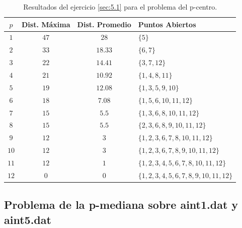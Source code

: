 \documentclass[spanish]{article}
\begin{document}
			\begin{table}[h]
				\begin{center}
					\begin{tabular}{|c || c || c || l | }
						\hline
						$p$		& Dist. Máxima 	& Dist. Promedio	& Puntos Abiertos	 \\ \hline \hline
						$1$ 	& $47$ 					& $28$						& $\{5\}$ \\ \hline
						$2$ 	& $33$ 					& $18.33$					& $\{6,7\}$ \\ \hline
						$3$ 	& $22$ 					& $14.41$					& $\{3,7,12\}$ \\ \hline
						$4$ 	& $21$ 					& $10.92$					& $\{1,4,8,11\}$ \\ \hline
						$5$ 	& $19$ 					& $12.08$					& $\{1,3,5,9,10\}$ \\ \hline
						$6$ 	& $18$ 					& $7.08$					& $\{1,5,6,10,11,12 \}$ \\ \hline
						$7$ 	& $15$ 					& $5.5$						& $\{1,3,6,8,10,11,12\}$ \\ \hline
						$8$ 	& $15$ 					& $5.5$						& $\{2,3,6,8,9,10,11,12\}$ \\ \hline
						$9$ 	& $12$ 					& $3$							& $\{1,2,3,6,7,8,10,11,12\}$ \\ \hline
						$10$ 	& $12$ 					& $3$							& $\{1,2,3,6,7,8,9,10,11,12\}$ \\ \hline
						$11$ 	& $12$ 					& $1$							& $\{1,2,3,4,5,6,7,8,10,11,12\}$ \\ \hline
						$12$ 	& $0$ 					& $0$							& $\{1,2,3,4,5,6,7,8,9,10,11,12\}$ \\
						\hline
					\end{tabular}
				\end{center}
				\caption{Resultados del ejercicio \ref{sec:5.1} para el problema del p-centro.}
				\label{table:sol-5.1center}
			\end{table}

		\subsection{Problema de la p-mediana sobre aint1.dat y aint5.dat}
		\label{sec:5.2}
\end{document}
